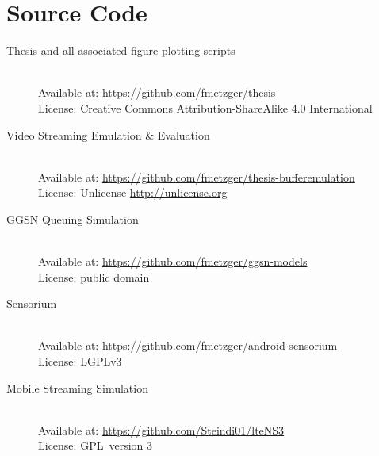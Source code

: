 \chapter*{Source Code}
%

\begin{description}
	\item[Thesis and all associated figure plotting scripts]\hfill \\
	Available at: \url{https://github.com/fmetzger/thesis} \\ %
	License: Creative Commons Attribution-ShareAlike 4.0 International \cite{ccbysa40}

	\item[Video Streaming Emulation \& Evaluation]\hfill \\
	Available at: \url{https://github.com/fmetzger/thesis-bufferemulation} \\
	License: Unlicense \url{http://unlicense.org}

	\item[GGSN Queuing Simulation]\hfill \\
	Available at: \url{https://github.com/fmetzger/ggsn-models} \\
	License: public domain

	\item[Sensorium]\hfill \\
	Available at: \url{https://github.com/fmetzger/android-sensorium} \\
	License: \gls{LGPLv3}~\cite{lgplv3}

	\item[Mobile Streaming Simulation]\hfill \\
	Available at: \url{https://github.com/Steindi01/lteNS3} \\
	License: \gls{GPL}~version 3~\cite{gplv3}

\end{description}